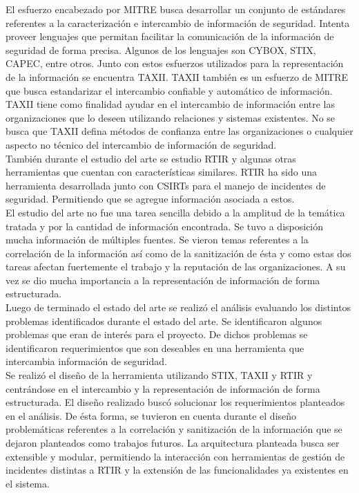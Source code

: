 \bigskip
El esfuerzo encabezado por MITRE busca desarrollar un conjunto de estándares referentes a la caracterización e intercambio de información de seguridad. Intenta proveer lenguajes que permitan facilitar la comunicación de la información de seguridad de forma precisa. Algunos de los lenguajes son CYBOX, STIX, CAPEC, entre otros. Junto con estos esfuerzos utilizados para la representación de la información se encuentra TAXII. TAXII también es un esfuerzo de MITRE que busca estandarizar el intercambio confiable y automático de información. TAXII tiene como finalidad ayudar en el intercambio de información entre las organizaciones que lo deseen utilizando relaciones y sistemas existentes. No se busca que TAXII defina métodos de confianza entre las organizaciones o cualquier aspecto no técnico del intercambio de información de seguridad.\\
\bigskip
También durante el estudio del arte se estudio RTIR y algunas otras herramientas que cuentan con características similares. RTIR ha sido una herramienta desarrollada junto con CSIRTs para el manejo de incidentes de seguridad. Permitiendo que se agregue información asociada a estos.\\
\bigskip
El estudio del arte no fue una tarea sencilla debido a la amplitud de la temática tratada y por la cantidad de información encontrada. Se tuvo a disposición mucha información de múltiples fuentes. Se vieron temas referentes a la correlación de la información así como de la sanitización de ésta y como estas dos tareas afectan fuertemente el trabajo y la reputación de las organizaciones. A su vez se dio mucha importancia a la representación de información de forma estructurada.\\
\bigskip
Luego de terminado el estado del arte se realizó el análisis evaluando los distintos problemas identificados durante el estado del arte. Se identificaron algunos problemas que eran de interés para el proyecto. De dichos problemas se identificaron requerimientos que son deseables en una herramienta que intercambia información de seguridad.\\
\bigskip
Se realizó el diseño de la herramienta utilizando STIX, TAXII y RTIR y centrándose en el intercambio y la representación de información de forma estructurada. El diseño realizado buscó solucionar los requerimientos planteados en el análisis. De ésta forma, se tuvieron en cuenta durante el diseño problemáticas referentes a la correlación y sanitización de la información que se dejaron planteados como trabajos futuros. La arquitectura planteada busca ser extensible y modular, permitiendo la interacción con herramientas de gestión de incidentes distintas a RTIR y la extensión de las funcionalidades ya existentes en el sistema.\\

